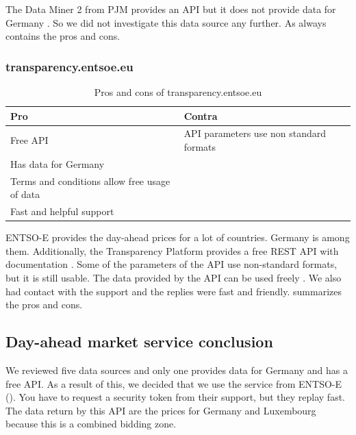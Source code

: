 The Data Miner 2 from PJM provides an API but it does not provide data for Germany \cite{dataminer}. 
So we did not investigate this data source any further. 
As always  contains the pros and cons.

\subsubsection{transparency.entsoe.eu}\label{subsubsec:entsoe}
\begin{table}[!h]
	\centering
	\begin{tabularx}{\textwidth}{ LLL }
		\toprule
		Pro & Contra \\\midrule
		 \tabitem Free API \cite{ENTSO} &\tabitem API parameters use non standard formats\\
		 \tabitem Has data for Germany &  \\
		 \tabitem Terms and conditions allow free usage of data \cite{ENTSO2} & \\
		 \tabitem Fast and helpful support \cite{ENTSO2} & \\
		\bottomrule
	\end{tabularx}
	\caption{Pros and cons of transparency.entsoe.eu}
	\label{tab:entsoe}
\end{table}

ENTSO-E provides the day-ahead prices for a lot of countries.
Germany is among them.
Additionally, the Transparency Platform provides a free REST API with documentation \cite{ENTSO}. 
Some of the parameters of the API use non-standard formats, but it is still usable.
The data provided by the API can be used freely \cite{ENTSO2}. 
We also had contact with the support and the replies were fast and friendly.
  summarizes the pros and cons.

\subsection{Day-ahead market service conclusion}

We reviewed five data sources and only one provides data for Germany and has a free API. 
As a result of this, we decided that we use the service from ENTSO-E (). 
You have to request a security token from their support, but they replay fast. 
The data return by this API are the prices for Germany and Luxembourg because this is a combined bidding zone.

